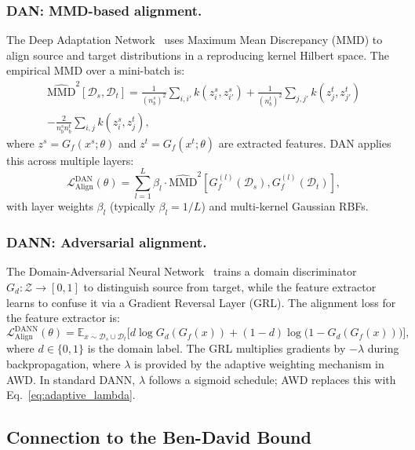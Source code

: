 \documentclass[pdflatex,sn-mathphys-num]{sn-jnl}
\theoremstyle{thmstyleone}
\theoremstyle{thmstyletwo}
\theoremstyle{thmstylethree}
\begin{document}
\subsubsection{DAN: MMD-based alignment.}
The Deep Adaptation Network~\cite{long2015dan} uses Maximum Mean Discrepancy (MMD) to align source and target distributions in a reproducing kernel Hilbert space. The empirical MMD over a mini-batch is:
\begin{multline}
\widehat{\text{MMD}}^2[\mathcal{D}_s, \mathcal{D}_t] =
\frac{1}{(n_b^s)^2} \sum_{i,i'} k(z_i^s, z_{i'}^s)
+ \frac{1}{(n_b^t)^2} \sum_{j,j'} k(z_j^t, z_{j'}^t) \\
- \frac{2}{n_b^s n_b^t} \sum_{i,j} k(z_i^s, z_j^t),
\label{eq:mmd_empirical}
\end{multline}
where $z^s = G_f(x^s; \theta)$ and $z^t = G_f(x^t; \theta)$ are extracted features. DAN applies this across multiple layers:
\begin{equation}
\mathcal{L}_{\text{Align}}^{\text{DAN}}(\theta) = \sum_{l=1}^{L} \beta_l \cdot \widehat{\text{MMD}}^2\left[G_f^{(l)}(\mathcal{D}_s), G_f^{(l)}(\mathcal{D}_t)\right],
\label{eq:dan_loss}
\end{equation}
with layer weights $\beta_l$ (typically $\beta_l = 1/L$) and multi-kernel Gaussian RBFs.

\subsubsection{DANN: Adversarial alignment.}
The Domain-Adversarial Neural Network~\cite{ganin2016dann} trains a domain discriminator $G_d: \mathcal{Z} \to [0,1]$ to distinguish source from target, while the feature extractor learns to confuse it via a Gradient Reversal Layer (GRL). The alignment loss for the feature extractor is:
\begin{equation}
\mathcal{L}_{\text{Align}}^{\text{DANN}}(\theta) = \mathbb{E}_{x \sim \mathcal{D}_s \cup \mathcal{D}_t} \Big[
d \log G_d(G_f(x)) + (1-d)\log\big(1 - G_d(G_f(x))\big)
\Big],
\label{eq:dann_loss}
\end{equation}
where $d \in \{0,1\}$ is the domain label. The GRL multiplies gradients by $-\lambda$ during backpropagation, where $\lambda$ is provided by the adaptive weighting mechanism in AWD. In standard DANN, $\lambda$ follows a sigmoid schedule; AWD replaces this with Eq.~\eqref{eq:adaptive_lambda}.

\subsection{Connection to the Ben-David Bound}
\end{document}
